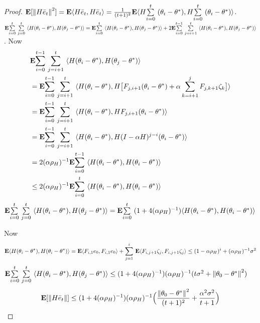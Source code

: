 \begin{proof}
$\E[\norm{H\eb_t}^2]=\E\ip{H\eb_t,H\eb_t}=\frac{1}{(t+1)^2}\E\ip{H\ous{\sum}{i=0}{t}(\theta_i-\ts),H\ous{\sum}{i=0}{t}(\theta_i-\ts)}$.
$\E\ous{\sum}{i=0}{t}\ous{\sum}{j=0}{t}\ip{H(\theta_i-\theta^*),H(\theta_j-\theta^*)}=\E\ous{\sum}{i=0}{t}\ip{H(\theta_i-\theta^*),H(\theta_j-\theta^*)}+ 2\E\ous{\sum}{i=0}{t-1}\ous{\sum}{j=i+1}{t}\ip{H(\theta_i-\theta^*),H(\theta_j-\theta^*)}$. Now
\begin{align}\label{inter}
&\E\ous{\sum}{i=0}{t-1}\ous{\sum}{j=i+1}{t}\ip{H(\theta_i-\theta^*),H(\theta_j-\theta^*)}\nn\\
&=\E\ous{\sum}{i=0}{t-1}\ous{\sum}{j=i+1}{t}\ip{H(\theta_i-\theta^*),H\big[F_{j,i+1} (\theta_i-\theta^*)+\alpha\sum_{k=i+1}^j F_{j,k+1}\zeta_{k}\big]}\nn\\
&=\E\ous{\sum}{i=0}{t-1}\ous{\sum}{j=i+1}{t}\ip{H(\theta_i-\theta^*),H F_{j,i+1} (\theta_i-\theta^*)}\nn\\
&=\E\ous{\sum}{i=0}{t-1}\ous{\sum}{j=i+1}{t}\ip{H(\theta_i-\theta^*),H(I-\alpha H)^{j-i} (\theta_i-\theta^*)}\nn\\
&=2(\alpha\rho_H)^{-1}\E\ous{\sum}{i=0}{t-1}\ip{H(\theta_i-\theta^*),H (\theta_i-\theta^*)}\nn\\
&\leq2(\alpha\rho_H)^{-1}\E\ous{\sum}{i=0}{t}\ip{H(\theta_i-\theta^*),H (\theta_i-\theta^*)}\nn\\
\end{align}
$\E\ous{\sum}{i=0}{t}\ous{\sum}{j=0}{t}\ip{H(\theta_i-\theta^*),H(\theta_j-\theta^*)}=\E\ous{\sum}{i=0}{t}(1+4(\alpha\rho_H)^{-1})\ip{H(\theta_i-\theta^*),H(\theta_i-\theta^*)}$

Now
\begin{align*}
\E\ip{H(\theta_i-\theta^*),H(\theta_i-\theta^*)}=\E\ip{F_{i,1}e_0,F_{i,1}e_0}+\ous{\sum}{j=1}{i}\E\ip{F_{i,j+1}\zeta_j,F_{i,j+1}\zeta_j}
\leq (1-\alpha\rho_H)^i+ (\alpha\rho_H)^{-1}\sigma^2
\end{align*}
$\E\ous{\sum}{i=0}{t}\ous{\sum}{j=0}{t}\ip{H(\theta_i-\theta^*),H(\theta_j-\theta^*)}\leq (1+4(\alpha\rho_H)^{-1}) (\alpha\rho_H)^{-1}(t\sigma^2+\norm{\theta_0-\ts}^2)$
\begin{align}
\E[\norm{H\eb_t}]\leq (1+4(\alpha\rho_H)^{-1}) (\alpha\rho_H)^{-1} \Big(\frac{\norm{\theta_0-\ts}^2}{(t+1)^2}+ \frac{\alpha^2\sigma^2}{t+1} \Big)
\end{align}
\end{proof}


